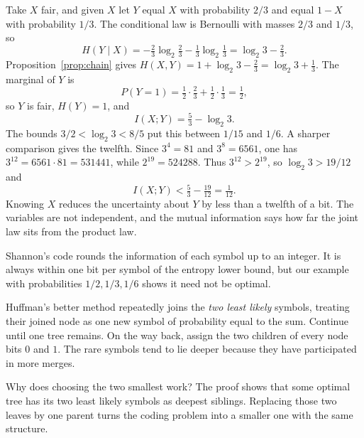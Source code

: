 Take $X$ fair, and given $X$ let $Y$ equal $X$ with probability $2/3$ and equal $1-X$ with probability $1/3$. The conditional law is Bernoulli with masses $2/3$ and $1/3$, so
\[
 H(Y\mid X)=-\tfrac23\log_2\tfrac23-\tfrac13\log_2\tfrac13=\log_2 3-\tfrac23.
\]
Proposition~\ref{prop:chain} gives $H(X,Y)=1+\log_2 3-\tfrac23=\log_2 3+\tfrac13$. The marginal of $Y$ is
\[
 P(Y=1)=\tfrac12\cdot\tfrac23+\tfrac12\cdot\tfrac13=\tfrac12,
\]
so $Y$ is fair, $H(Y)=1$, and
\[
 I(X;Y)=\tfrac53-\log_2 3.
\]
The bounds $3/2<\log_2 3<8/5$ put this between $1/15$ and $1/6$. A sharper comparison gives the twelfth. Since $3^4=81$ and $3^8=6561$, one has $3^{12}=6561\cdot81=531441$, while $2^{19}=524288$. Thus $3^{12}>2^{19}$, so $\log_2 3>19/12$ and
\[
 I(X;Y)<\tfrac53-\tfrac{19}{12}=\tfrac1{12}.
\]
Knowing $X$ reduces the uncertainty about $Y$ by less than a twelfth of a bit. The variables are not independent, and the mutual information says how far the joint law sits from the product law.

Shannon's code rounds the information of each symbol up to an integer. It is always within one bit per symbol of the entropy lower bound, but our example with probabilities $1/2,1/3,1/6$ shows it need not be optimal.

Huffman's better method repeatedly joins the \emph{two least likely} symbols, treating their joined node as one new symbol of probability equal to the sum. Continue until one tree remains. On the way back, assign the two children of every node bits $0$ and $1$. The rare symbols tend to lie deeper because they have participated in more merges.

Why does choosing the two smallest work? The proof shows that some optimal tree has its two least likely symbols as deepest siblings. Replacing those two leaves by one parent turns the coding problem into a smaller one with the same structure.

